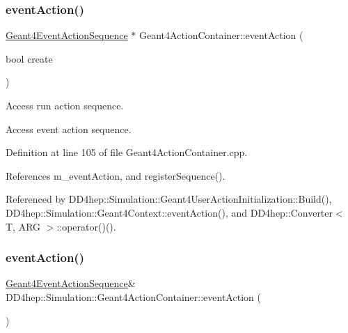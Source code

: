 \subsubsection{\texorpdfstring{event\+Action()}{eventAction()}\hspace{0.1cm}{\footnotesize\ttfamily [1/2]}}
{\footnotesize\ttfamily \hyperlink{class_d_d4hep_1_1_simulation_1_1_geant4_event_action_sequence}{Geant4\+Event\+Action\+Sequence} $\ast$ Geant4\+Action\+Container\+::event\+Action (\begin{DoxyParamCaption}\item[{bool}]{create }\end{DoxyParamCaption})}



Access run action sequence. 

Access event action sequence. 

Definition at line 105 of file Geant4\+Action\+Container.\+cpp.



References m\+\_\+event\+Action, and register\+Sequence().



Referenced by D\+D4hep\+::\+Simulation\+::\+Geant4\+User\+Action\+Initialization\+::\+Build(), D\+D4hep\+::\+Simulation\+::\+Geant4\+Context\+::event\+Action(), and D\+D4hep\+::\+Converter$<$ T, A\+R\+G $>$\+::operator()().

\hypertarget{class_d_d4hep_1_1_simulation_1_1_geant4_action_container_a50aa73045e0959041a1ae5c162ab840d}{}\label{class_d_d4hep_1_1_simulation_1_1_geant4_action_container_a50aa73045e0959041a1ae5c162ab840d} 
\subsubsection{\texorpdfstring{event\+Action()}{eventAction()}\hspace{0.1cm}{\footnotesize\ttfamily [2/2]}}
{\footnotesize\ttfamily \hyperlink{class_d_d4hep_1_1_simulation_1_1_geant4_event_action_sequence}{Geant4\+Event\+Action\+Sequence}\& D\+D4hep\+::\+Simulation\+::\+Geant4\+Action\+Container\+::event\+Action (\begin{DoxyParamCaption}{ }\end{DoxyParamCaption})\hspace{0.3cm}{\ttfamily [inline]}}



